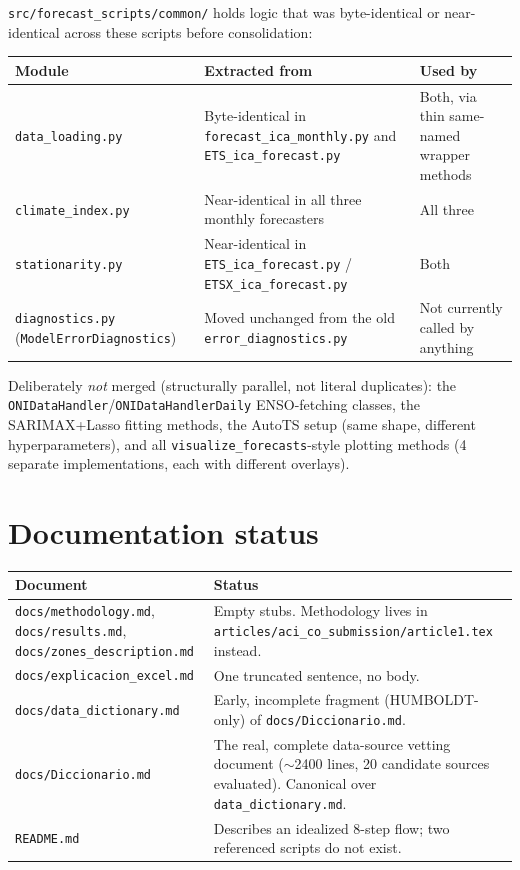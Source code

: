 \documentclass[11pt]{article}
\begin{document}
\texttt{src/forecast\_scripts/common/} holds logic that was byte-identical
or near-identical across these scripts before consolidation:

\begin{longtable}{@{}L{3.0cm}L{5.7cm}L{5.1cm}@{}}
\toprule
\textbf{Module} & \textbf{Extracted from} & \textbf{Used by} \\
\midrule
\endhead
\texttt{data\_loading.py} & Byte-identical in \texttt{forecast\_ica\_monthly.py} and \texttt{ETS\_ica\_forecast.py} & Both, via thin same-named wrapper methods \\
\texttt{climate\_index.py} & Near-identical in all three monthly forecasters & All three \\
\texttt{stationarity.py} & Near-identical in \texttt{ETS\_ica\_forecast.py} / \texttt{ETSX\_ica\_forecast.py} & Both \\
\texttt{diagnostics.py} (\texttt{Model\-Error\-Diagnostics}) & Moved unchanged from the old \texttt{error\_diagnostics.py} & Not currently called by anything \\
\bottomrule
\end{longtable}

Deliberately \emph{not} merged (structurally parallel, not literal
duplicates): the \texttt{ONIDataHandler}\allowbreak/\texttt{ONIDataHandlerDaily}
ENSO-fetching classes, the SARIMAX+Lasso fitting methods, the AutoTS setup
(same shape, different hyperparameters), and all
\texttt{visualize\_forecasts}-style plotting methods (4 separate
implementations, each with different overlays).

\section{Documentation status}

\begin{longtable}{@{}L{4.6cm}L{9.4cm}@{}}
\toprule
\textbf{Document} & \textbf{Status} \\
\midrule
\endhead
\texttt{docs/methodology.md}, \texttt{docs/results.md}, \texttt{docs/zones\_description.md} & Empty stubs. Methodology lives in \texttt{articles/aci\_co\_submission/article1.tex} instead. \\
\texttt{docs/explicacion\_excel.md} & One truncated sentence, no body. \\
\texttt{docs/data\_dictionary.md} & Early, incomplete fragment (HUMBOLDT-only) of \texttt{docs/Diccionario.md}. \\
\texttt{docs/Diccionario.md} & The real, complete data-source vetting document ($\sim$2400 lines, 20 candidate sources evaluated). Canonical over \texttt{data\_dictionary.md}. \\
\texttt{README.md} & Describes an idealized 8-step flow; two referenced scripts do not exist. \\
\bottomrule
\end{longtable}
\end{document}
